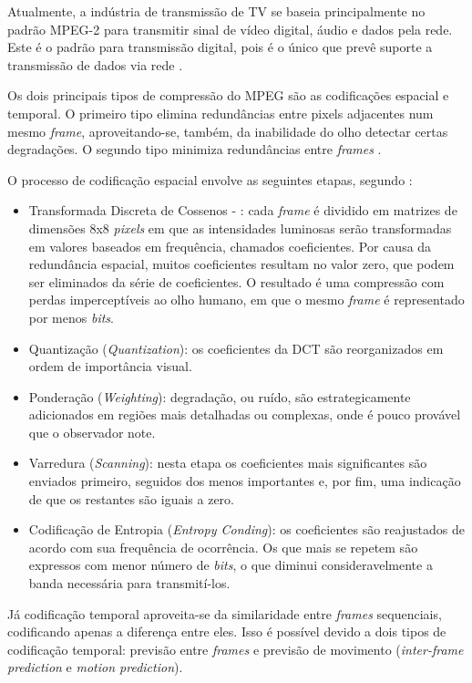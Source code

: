 Atualmente, a indústria de transmissão de TV se baseia principalmente no padrão MPEG-2 para transmitir sinal de vídeo digital, áudio e dados pela rede. Este é o padrão para transmissão digital, pois é o único que prevê suporte a transmissão de dados via rede \cite{mpeg2ref}.

Os dois principais tipos de compressão do MPEG são as codificações espacial e temporal. O primeiro tipo elimina redundâncias entre pixels adjacentes num mesmo \emph{frame}, aproveitando-se, também, da inabilidade do olho detectar certas degradações. O segundo tipo minimiza redundâncias entre \emph{frames} \cite{mpeg2ref}.

O processo de codificação espacial envolve as seguintes etapas, segundo \cite{mpeg2ref}:
\begin{itemize}
    \item Transformada Discreta de Cossenos - : cada \emph{frame} é dividido em matrizes de dimensões 8x8 \emph{pixels} em que as intensidades luminosas serão transformadas em valores baseados em frequência, chamados coeficientes. Por causa da redundância espacial, muitos coeficientes resultam no valor zero, que podem ser eliminados da série de coeficientes. O resultado é uma compressão com perdas imperceptíveis ao olho humano, em que o mesmo \emph{frame} é representado por menos \emph{bits}.
    \item Quantização (\emph{Quantization}): os coeficientes da DCT são reorganizados em ordem de importância visual.
    \item Ponderação (\emph{Weighting}): degradação, ou ruído, são estrategicamente adicionados em regiões mais detalhadas ou complexas, onde é pouco provável que o observador note. 
    \item Varredura (\emph{Scanning}): nesta etapa os coeficientes mais significantes são enviados primeiro, seguidos dos menos importantes e, por fim, uma indicação de que os restantes são iguais a zero.
    \item Codificação de Entropia (\emph{Entropy Conding}): os coeficientes são reajustados de acordo com sua frequência de ocorrência. Os que mais se repetem são expressos com menor número de \emph{bits}, o que diminui consideravelmente a banda necessária para transmití-los.
\end{itemize}

Já codificação temporal aproveita-se da similaridade entre \emph{frames} sequenciais, codificando apenas a diferença entre eles. Isso é possível devido a dois tipos de codificação temporal: previsão entre \emph{frames} e previsão de movimento (\emph{inter-frame prediction} e \emph{motion prediction}).


